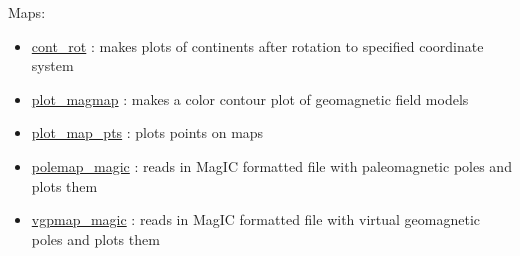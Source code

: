 \documentclass[11pt]{book}
\begin{document}
{{\begin{itemize}
\end{itemize}

Maps:

\begin{itemize}

  \item \href{http://pmagpy.github.io/PmagPy.html#cont_rot}{cont\_rot} : makes plots of continents after rotation to specified coordinate system
\item \href{http://pmagpy.github.io/PmagPy.html#plot_magmap}{plot\_magmap} : makes a color contour plot of geomagnetic field models
\item \href{http://pmagpy.github.io/PmagPy.html#plot_map_pts}{plot\_map\_pts} : plots points on maps
\item \href{http://pmagpy.github.io/PmagPy.html#polemap_magic}{polemap\_magic} : reads in MagIC formatted file with paleomagnetic poles and plots them
\item \href{http://pmagpy.github.io/PmagPy.html#vgpmap_magic}{vgpmap\_magic} : reads in MagIC formatted file with virtual geomagnetic poles and plots them

\end{itemize}

}}
\end{document}
